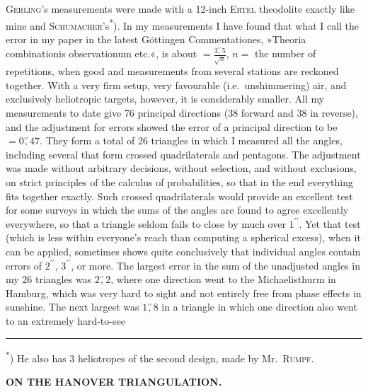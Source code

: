 \par\noindent\hspace*{\parindent}\textsc{Gerling}'s measurements were made with a 12-inch \textsc{Ertel} theodolite exactly like mine and \textsc{Schumacher}'s\textsuperscript{*}).
In my measurements I have found that what I call the  error in my paper in the latest Göttingen Commentationes, »Theoria combinationis observationum etc.«, is about \(=\frac{3\mathord{\overset{\prime\prime}{,}}5}{\surd n}\), \(n=\) the number of repetitions, when good and  measurements from several stations are reckoned together.
With a very firm setup, very favourable (i.e.\ unshimmering) air, and exclusively heliotropic targets, however, it is considerably smaller.
All my measurements to date give 76 principal directions (38 forward and 38 in reverse), and the adjustment for errors showed the  error of a principal direction to be \(=0\mathord{\overset{\prime\prime}{,}}47\).
They form a total of 26 triangles in which I measured all the angles, including several that form crossed quadrilaterals and pentagons. The adjustment was made without arbitrary decisions, without selection, and without exclusions, on strict principles of the calculus of probabilities, so that in the end everything fits together exactly.
Such crossed quadrilaterals would provide an excellent test for some surveys in which the sums of the angles are found to agree excellently everywhere, so that a triangle seldom fails to close by much over \(1^{\prime\prime}\). Yet that test (which is less within everyone's reach than computing a spherical excess), when it can be applied, sometimes shows quite conclusively that individual angles contain errors of \(2^{\prime\prime}\), \(3^{\prime\prime}\), or more.
The largest error in the sum of the unadjusted angles in my 26 triangles was \(2\mathord{\overset{\prime\prime}{,}}2\), where one direction went to the Michaelisthurm in Hamburg, which was very hard to sight and not entirely free from phase effects in sunshine. The next largest was \(1\mathord{\overset{\prime\prime}{,}}8\) in a triangle in which one direction also went to an extremely hard-to-see
\par\smallskip\noindent\rule{.24\textwidth}{.4pt}\par\smallskip
{\footnotesize\noindent\hspace*{1.5em}\textsuperscript{*}) He also has 3 heliotropes of the second design, made by Mr.~\textsc{Rumpf}.\par}
\clearpage
\noindent\null\hfill{\small\textbf{ON THE HANOVER TRIANGULATION.}}\hfill{}\par\medskip
